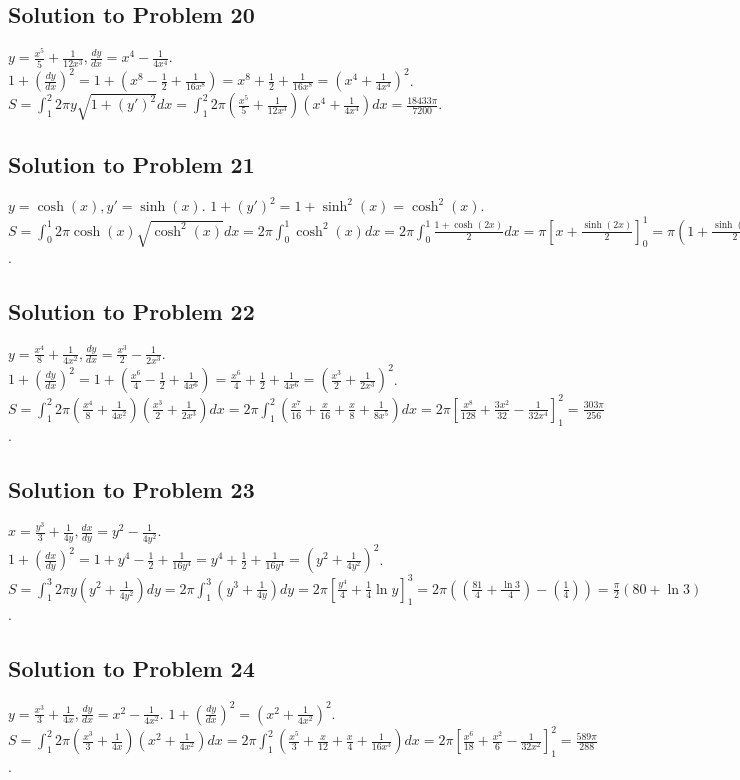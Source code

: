 \documentclass[12pt]{article}
\begin{document}
\subsection*{Solution to Problem 20}
$y=\frac{x^5}{5}+\frac{1}{12x^3}, \frac{dy}{dx}=x^4-\frac{1}{4x^4}$. $1+(\frac{dy}{dx})^2 = 1+(x^8-\frac{1}{2}+\frac{1}{16x^8}) = x^8+\frac{1}{2}+\frac{1}{16x^8}=(x^4+\frac{1}{4x^4})^2$.
$S = \int_1^2 2\pi y \sqrt{1+(y')^2} dx = \int_1^2 2\pi (\frac{x^5}{5}+\frac{1}{12x^3})(x^4+\frac{1}{4x^4}) dx = \frac{18433\pi}{7200}$.

\subsection*{Solution to Problem 21}
$y=\cosh(x), y'=\sinh(x)$. $1+(y')^2=1+\sinh^2(x)=\cosh^2(x)$.
$S = \int_0^1 2\pi\cosh(x)\sqrt{\cosh^2(x)}dx = 2\pi\int_0^1 \cosh^2(x)dx = 2\pi\int_0^1 \frac{1+\cosh(2x)}{2}dx = \pi[x+\frac{\sinh(2x)}{2}]_0^1 = \pi(1+\frac{\sinh(2)}{2})$.

\subsection*{Solution to Problem 22}
$y=\frac{x^4}{8}+\frac{1}{4x^2}, \frac{dy}{dx}=\frac{x^3}{2}-\frac{1}{2x^3}$. $1+(\frac{dy}{dx})^2=1+(\frac{x^6}{4}-\frac{1}{2}+\frac{1}{4x^6})=\frac{x^6}{4}+\frac{1}{2}+\frac{1}{4x^6}=(\frac{x^3}{2}+\frac{1}{2x^3})^2$.
$S=\int_1^2 2\pi(\frac{x^4}{8}+\frac{1}{4x^2})(\frac{x^3}{2}+\frac{1}{2x^3})dx=2\pi\int_1^2(\frac{x^7}{16}+\frac{x}{16}+\frac{x}{8}+\frac{1}{8x^5})dx = 2\pi[\frac{x^8}{128}+\frac{3x^2}{32}-\frac{1}{32x^4}]_1^2 = \frac{303\pi}{256}$.

\subsection*{Solution to Problem 23}
$x=\frac{y^3}{3}+\frac{1}{4y}, \frac{dx}{dy}=y^2-\frac{1}{4y^2}$. $1+(\frac{dx}{dy})^2=1+y^4-\frac{1}{2}+\frac{1}{16y^4}=y^4+\frac{1}{2}+\frac{1}{16y^4}=(y^2+\frac{1}{4y^2})^2$.
$S=\int_1^3 2\pi y(y^2+\frac{1}{4y^2})dy = 2\pi\int_1^3(y^3+\frac{1}{4y})dy = 2\pi[\frac{y^4}{4}+\frac{1}{4}\ln y]_1^3 = 2\pi((\frac{81}{4}+\frac{\ln 3}{4})-(\frac{1}{4})) = \frac{\pi}{2}(80+\ln 3)$.

\subsection*{Solution to Problem 24}
$y=\frac{x^3}{3}+\frac{1}{4x}, \frac{dy}{dx}=x^2-\frac{1}{4x^2}$. $1+(\frac{dy}{dx})^2 = (x^2+\frac{1}{4x^2})^2$.
$S=\int_1^2 2\pi(\frac{x^3}{3}+\frac{1}{4x})(x^2+\frac{1}{4x^2})dx=2\pi\int_1^2(\frac{x^5}{3}+\frac{x}{12}+\frac{x}{4}+\frac{1}{16x^3})dx=2\pi[\frac{x^6}{18}+\frac{x^2}{6}-\frac{1}{32x^2}]_1^2 = \frac{589\pi}{288}$.
\end{document}
